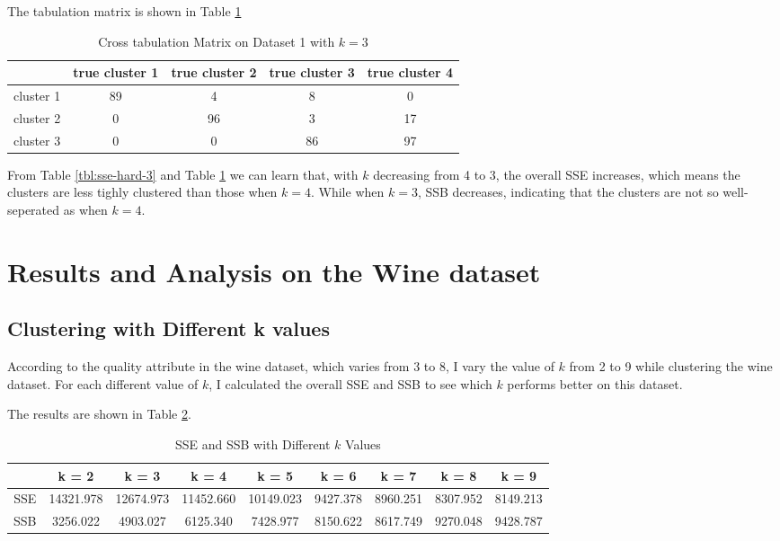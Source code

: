 \documentclass{article}
\begin{document}
		The tabulation matrix is shown in Table \ref{tbl:cross-hard-3}

		\begin{table}[H]
		\centering
			\begin{tabular}{|c|c|c|c|c|}
			\hline
			& true cluster 1 & true cluster 2 & true cluster 3 & true cluster 4\\
			\hline
			cluster 1& 89 &  4 &  8 &  0 \\
			\hline
            cluster 2&  0 & 96 &  3 & 17 \\
            \hline
            cluster 3&  0 &  0 & 86 & 97 \\
            \hline
			\end{tabular}
			\caption{Cross tabulation Matrix on Dataset 1 with $k=3$}
			\label{tbl:cross-hard-3}
		\end{table}

		From Table \ref{tbl:sse-hard-3} and Table \ref{tbl:cross-hard-3} we can learn that, with $k$ decreasing from 4 to 3, the overall SSE increases, which means the clusters are less tighly clustered than those when $k=4$. While when $k=3$, SSB decreases, indicating that the clusters are not so well-seperated as when $k=4$.
		
\section{Results and Analysis on the Wine dataset}
	\subsection{Clustering with Different k values}
		According to the quality attribute in the wine dataset, which varies from 3 to 8, I vary the value of $k$ from 2 to 9 while clustering the wine dataset. For each different value of $k$, I calculated the overall SSE and SSB to see which $k$ performs better on this dataset.

		The results are shown in Table \ref{tbl:wine-sse-ssb}.

		\begin{table}[H]
		\centering
			\begin{tabular}{|c|c|c|c|c|c|c|c|c|}
			\hline
			& k = 2 &  k = 3 & k = 4 &  k = 5 &  k = 6 &  k = 7 &  k = 8 &  k = 9 \\
			\hline
			SSE & 14321.978 & 12674.973 & 11452.660 & 10149.023  & 9427.378  & 8960.251  & 8307.952 & 8149.213 \\
			\hline
			SSB & 3256.022 &4903.027 &6125.340 &7428.977 &8150.622 &8617.749 &9270.048 &9428.787 \\
			\hline
			\end{tabular}
			\caption{SSE and SSB with Different $k$ Values}
			\label{tbl:wine-sse-ssb}
		\end{table}
\end{document}
